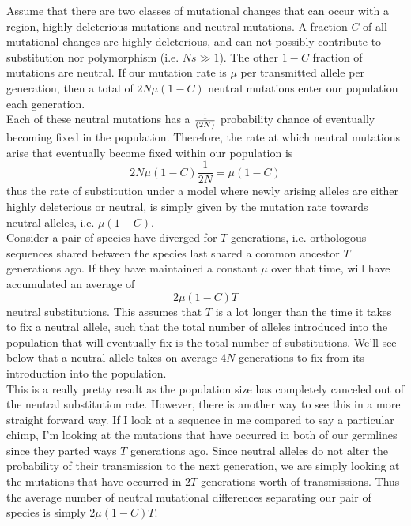 Assume that there are two classes of mutational changes that can occur with a
region, highly deleterious mutations and neutral mutations. A fraction $C$ of
all mutational changes are highly deleterious, and can not possibly contribute
to substitution nor polymorphism (i.e. $Ns \gg 1$).  The other $1-C$ fraction
of mutations are neutral. If our mutation rate is $\mu$ per transmitted allele
per generation, then a total of $2N \mu (1-C)$ neutral mutations enter our
population each generation.\\

Each of these neutral mutations has a $\nicefrac{1}{(2N)}$ probability chance of
eventually becoming fixed in the population. Therefore, the rate at
which neutral mutations arise that eventually become fixed within our
population is  
\begin{equation}
2N\mu(1-C)\frac{1}{2N} = \mu(1-C)
\end{equation}
thus the rate of substitution under a model where newly arising alleles are either
highly deleterious or neutral, is simply given by the mutation rate
towards neutral alleles, i.e. $\mu(1-C)$.\\

Consider a pair of species have diverged for $T$ generations, i.e. orthologous sequences shared between the species last shared a common ancestor $T$ generations ago. If they have maintained a constant $\mu$ over that time, will have accumulated an average of
\begin{equation}
2\mu(1-C)T
\end{equation}
neutral substitutions. This assumes that $T$ is a lot longer than the time it
takes to fix a neutral allele, such that the total number of 
alleles introduced into the population that will eventually fix is the
total number of substitutions. We'll see below that a neutral allele
takes on average $4N$ generations to fix from its introduction into
the population.\\

This is a really pretty result as the population size has completely canceled
out of the neutral substitution rate. However, there is another way to see this
in a more straight forward way. If I look at a sequence in me compared to say a
particular chimp, I'm looking at the mutations that have occurred in both of
our germlines since they parted ways $T$ generations ago. Since neutral alleles
do not alter the probability of their transmission to the next generation, we
are simply looking at the mutations that have occurred in $2T$ generations
worth of transmissions. Thus the average number of neutral mutational
differences separating our pair of species is simply $2\mu (1-C) T$.\\

